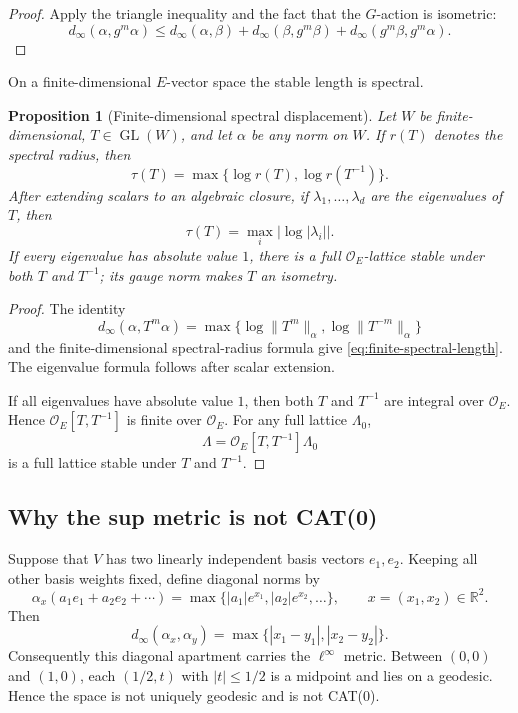 \documentclass[12pt]{article}
\newtheorem{proposition}[theorem]{Proposition}
\theoremstyle{definition}
\theoremstyle{remark}
\newcommand{\R}{\mathbb R}
\newcommand{\dinf}{d_{\infty}}
\newcommand{\Ocoeff}{\mathcal O_E}
\DeclareMathOperator{\GL}{GL}
\begin{document}
\begin{proof}
Apply the triangle inequality and the fact that the \(G\)-action is
isometric:
\[
 \dinf(\alpha,g^m\alpha)
 \leq
 \dinf(\alpha,\beta)
 +
 \dinf(\beta,g^m\beta)
 +
 \dinf(g^m\beta,g^m\alpha).
\]
\end{proof}

On a finite-dimensional \(E\)-vector space the stable length is spectral.

\begin{proposition}[Finite-dimensional spectral displacement]
\label{prop:finite-spectral-displacement}
Let \(W\) be finite-dimensional, \(T\in\GL(W)\), and let \(\alpha\) be any
norm on \(W\).  If \(r(T)\) denotes the spectral radius, then
\begin{equation}\label{eq:finite-spectral-length}
 \tau(T)
 =
 \max\{\log r(T),\log r(T^{-1})\}.
\end{equation}
After extending scalars to an algebraic closure, if
\(\lambda_1,\ldots,\lambda_d\) are the eigenvalues of \(T\), then
\begin{equation}\label{eq:finite-spectral-length-eigenvalues}
 \tau(T)
 =
 \max_i\left|\log|\lambda_i|\right|.
\end{equation}
If every eigenvalue has absolute value \(1\), there is a full
\(\Ocoeff\)-lattice stable under both \(T\) and \(T^{-1}\); its gauge norm
makes \(T\) an isometry.
\end{proposition}

\begin{proof}
The identity
\[
 \dinf(\alpha,T^m\alpha)
 =
 \max\{\log\|T^m\|_\alpha,\log\|T^{-m}\|_\alpha\}
\]
and the finite-dimensional spectral-radius formula give
\eqref{eq:finite-spectral-length}.  The eigenvalue formula follows after
scalar extension.

If all eigenvalues have absolute value \(1\), then both \(T\) and \(T^{-1}\)
are integral over \(\Ocoeff\).  Hence \(\Ocoeff[T,T^{-1}]\) is finite over
\(\Ocoeff\).  For any full lattice \(\Lambda_0\),
\[
 \Lambda=\Ocoeff[T,T^{-1}]\Lambda_0
\]
is a full lattice stable under \(T\) and \(T^{-1}\).
\end{proof}

\subsection{Why the sup metric is not CAT(0)}

Suppose that $V$ has two linearly independent basis vectors $e_1,e_2$.
Keeping all other basis weights fixed, define diagonal norms by
\[
  \alpha_x(a_1e_1+a_2e_2+\cdots)
   =\max\{|a_1|e^{x_1},|a_2|e^{x_2},\ldots\},
  \qquad x=(x_1,x_2)\in\R^2.
\]
Then
\[
  \dinf(\alpha_x,\alpha_y)
    =\max\{|x_1-y_1|,|x_2-y_2|\}.
\]
Consequently this diagonal apartment carries the $\ell^\infty$ metric.
Between $(0,0)$ and $(1,0)$, each $(1/2,t)$ with
$|t|\leq1/2$ is a midpoint and lies on a geodesic.  Hence the space is
not uniquely geodesic and is not CAT(0).
\end{document}
